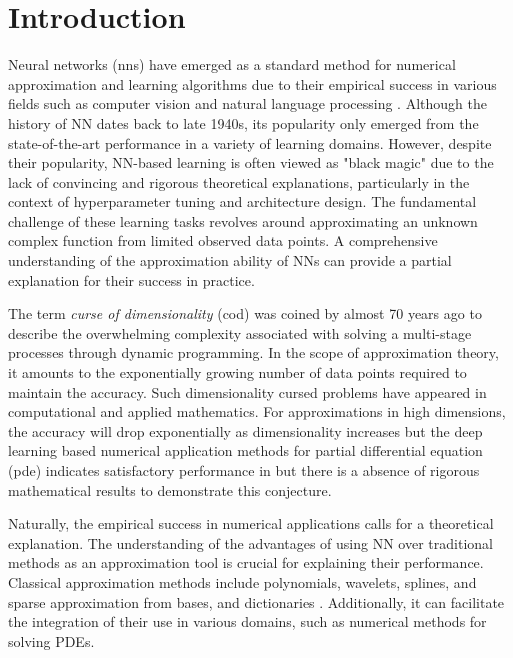 \chapter{Introduction}
\label{ch:introduction}


Neural networks (\gls{nn}s) have emerged as a standard method for numerical
approximation and learning algorithms due to their empirical success in various
fields such as computer vision and natural language processing
\citep{shalev-shwartzUnderstandingMachineLearning2014}. Although the history of
NN dates back to late 1940s, its popularity only emerged from the
state-of-the-art performance in a variety of learning domains. However, despite
their popularity, NN-based learning is often viewed as "black magic" due to the
lack of convincing and rigorous theoretical explanations, particularly in the
context of hyperparameter tuning and architecture design. The fundamental
challenge of these learning tasks revolves around approximating an unknown
complex function from limited observed data points. A comprehensive
understanding of the approximation ability of NNs can provide a partial
explanation for their success in practice.


The term \textit{curse of dimensionality} (\gls{cod}) was coined by
\cite{bellmanTheoryDynamicProgramming1952} almost 70 years ago to describe the
overwhelming complexity associated with solving a multi-stage processes through
dynamic programming. In the scope of approximation theory, it amounts to the
exponentially growing number of data points required to maintain the accuracy.
Such dimensionality cursed problems have appeared in computational and applied
mathematics. For approximations in high dimensions, the accuracy will drop
exponentially as dimensionality increases but the deep learning based numerical
application methods for partial differential equation (\gls{pde}) indicates
satisfactory performance in \cite{eDeepRitzMethod2017,
eDeepLearningbasedNumerical2017,beckMachineLearningApproximation2019} but there
is a absence of rigorous mathematical results to demonstrate this conjecture.



Naturally, the empirical success in numerical applications calls for a
theoretical explanation. The understanding of the advantages of using NN over
traditional methods as an approximation tool is crucial for explaining their
performance. Classical approximation methods include polynomials, wavelets,
splines, and sparse approximation from bases, and dictionaries
\citep{devore_1998}. Additionally, it can facilitate the integration of their
use in various domains, such as numerical methods for solving PDEs.

